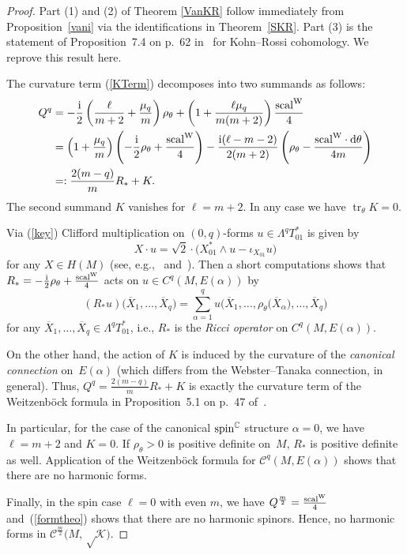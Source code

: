\documentclass[pdftex]{sigma}
\numberwithin{equation}{section}
\newcommand{\CC}{\mathbb{C}}
\begin{document}
\begin{proof} Part (1) and (2) of Theorem \ref{VanKR} follow immediately from Proposition~\ref{vani} via the identifications in Theorem~\ref{SKR}.
Part (3) is the statement of Proposition~7.4 on p.~62 in~\cite{Tan} for Kohn--Rossi cohomology.
We reprove this result here.

The curvature term (\ref{KTerm}) decomposes into two summands as follows:
\begin{align*}
Q^q & = - \frac{{\rm i}}{2}\left( \frac{\ell}{m+2}+\frac{\mu_q}{m}\right)\rho_\theta + \left(1+\frac{\ell\mu_q}{m(m+2)}\right)\frac{{\rm scal}^{\rm W}}{4}\\
&= \left( 1+ \frac{\mu_q}{m} \right)\left( -\frac{{\rm i}}{2}\rho_\theta +\frac{{\rm scal}^{\rm W}}{4} \right) -
\frac{{\rm i}(\ell-m-2)}{2(m+2)}\left( \rho_\theta-\frac{{\rm scal}^{\rm W}\cdot {\rm d}\theta}{4m}\right)\\
&=: \frac{2(m-q)}{m}R_* + K.
\end{align*}
The second summand $K$ vanishes for $\ell=m+2$. In any case we have $\operatorname{tr}_\theta K=0$.

Via (\ref{key}) Clifford multiplication on $(0,q)$-forms $u\in \Lambda^qT^*_{01}$ is given by
\[
X\cdot u = \sqrt{2}\cdot\big( X^*_{01}\wedge u - \iota_{X_{01}}u \big)
\]
for any $X\in H(M)$ (see, e.g., \cite{Morg}~and~\cite{Pet}). Then a short computations shows that $R_*=-\frac{{\rm i}}{2}\rho_\theta +\frac{{\rm scal}^{\rm W}}{4}$ acts
on $u\in C^q(M,E(\alpha))$ by
\[
(R_*u)\big(\overline{X}_1,\dots,\overline{X}_q\big) = \sum_{\alpha=1}^q u\big(\overline{X}_1,\dots,\rho_\theta\big(\overline{X}_\alpha\big),\dots, \overline{X}_q\big)
\]
for any $\overline{X}_1,\dots,\overline{X}_q\in \Lambda^qT^*_{01}$, i.e., $R_*$ is the {\em Ricci operator} on $C^q(M,E(\alpha))$.

On the other hand, the action of $K$ is induced by the curvature of the {\em canonical connection} on~$E(\alpha)$ (which differs from the Webster--Tanaka connection, in general). Thus, $Q^q=\frac{2(m-q)}{m}R_*+K$ is exactly the curvature term of the Weitzenb\"ock formula in Proposition~5.1 on p.~47 of~\cite{Tan}.

In particular, for the case of the canonical ${\rm spin}^\CC$ structure $\alpha=0$, we have $\ell=m+2$ and $K=0$.
If $\rho_\theta> 0$ is positive definite on~$M$, $R_*$ is positive definite as well. Application of the Weitzenb\"ock formula for
$\mathcal{C}^q(M,E(\alpha))$ shows that there are no harmonic forms.

Finally, in the spin case $\ell=0$ with even $m$, we have $Q^{\frac{m}{2}}=\frac{{\rm scal}^{\rm W}}{4}$ and~(\ref{formtheo}) shows that there are no harmonic spinors. Hence, no harmonic forms in $\mathcal{C}^{\frac{m}{2}}\big(M,\sqrt\mathcal{{K}}\big)$.
\end{proof}
\end{document}

